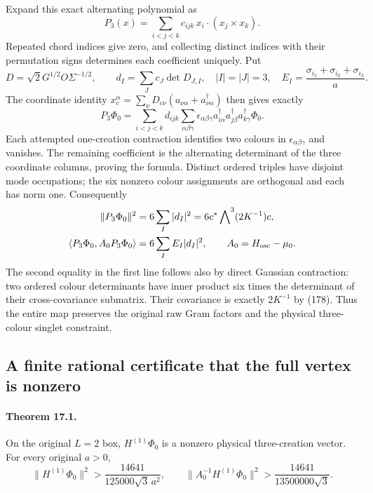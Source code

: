 \documentclass[11pt]{article}
\begin{document}
Expand this exact alternating polynomial as
\[
 P_3(x)=\sum_{i<j<k}c_{ijk}\,
                 x_i\cdot(x_j\times x_k).
\]
Repeated chord indices give zero, and collecting distinct indices with
their permutation signs determines each coefficient uniquely. Put
\[
 D=\sqrt2G^{1/2}O\Sigma^{-1/2},\qquad
 d_I=\sum_J c_J\det D_{J,I},\quad |I|=|J|=3,
 \quad E_I=\frac{\sigma_{i_1}+\sigma_{i_2}+\sigma_{i_3}}a.
\]
The coordinate identity $x_c^\alpha=\sum_\nu D_{c\nu}
(a_{\nu\alpha}+a^\dagger_{\nu\alpha})$ then gives exactly
\begin{equation}\label{eq:vertex-three-state}
 P_3\Phi_0=\sum_{i<j<k}d_{ijk}\sum_{\alpha\beta\gamma}
   \epsilon_{\alpha\beta\gamma}
   a^\dagger_{i\alpha}a^\dagger_{j\beta}a^\dagger_{k\gamma}\Phi_0.
\end{equation}
Each attempted one-creation contraction identifies two colours in
$\epsilon_{\alpha\beta\gamma}$ and vanishes. The remaining
coefficient is the alternating determinant of the three coordinate
columns, proving the formula. Distinct ordered triples have disjoint
mode occupations; the six nonzero colour assignments are orthogonal
and each has norm one. Consequently
\begin{align}
 \|P_3\Phi_0\|^2&=6\sum_I|d_I|^2
       =6c^*\bigwedge\nolimits^3(2K^{-1})c,\nonumber\\
 \langle P_3\Phi_0,A_0P_3\Phi_0\rangle&=6\sum_I E_I|d_I|^2,
 \qquad A_0=H_{\rm osc}-\mu_0 .\label{eq:vertex-raw-moments}
\end{align}
The second equality in the first line follows also by direct Gaussian
contraction: two ordered colour determinants have inner product six
times the determinant of their cross-covariance submatrix. Their
covariance is exactly $2K^{-1}$ by (178).
Thus the entire map preserves the original raw Gram factors and
the physical three-colour singlet constraint.

\subsection{A finite rational certificate that the full vertex is nonzero}

\paragraph{Theorem 17.1.}
On the original $L=2$ box, $H^{(1)}\Phi_0$ is a nonzero physical
three-creation vector. For every original $a>0$,
\begin{equation}\label{eq:vertex-lower-bounds}
 \|H^{(1)}\Phi_0\|^2>
              \frac{14641}{125000\sqrt3\,a^2},\qquad
 \|A_0^{-1}H^{(1)}\Phi_0\|^2>
              \frac{14641}{13500000\sqrt3}.
\end{equation}
\end{document}
